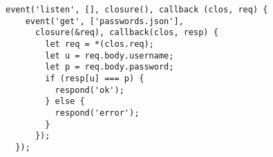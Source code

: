 \documentclass[sigplan,10pt,review=false,nonacm=true]{acmart}
\begin{document}
\begin{figure*}
\lstset{language=JavaScript}
\begin{lstlisting}[escapechar=!]
  event('listen', [], closure(), callback (clos, req) {
    event('get', ['passwords.json'],
      closure(&req), callback(clos, resp) {
        let req = *(clos.req);
        let u = req.body.username;
        let p = req.body.password;
        if (resp[u] === p) {
          respond('ok');
        } else {
          respond('error');
        }
      });
  });
\end{lstlisting}
\end{figure*}



\end{document}
